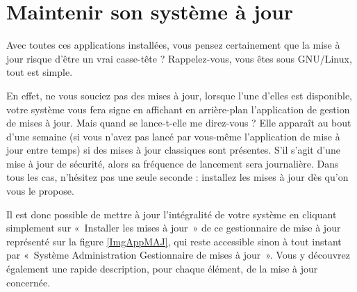 \section{Maintenir son système à jour}
Avec toutes ces applications installées, vous pensez certainement que la mise à jour risque d'être un vrai casse-tête ? Rappelez-vous, vous êtes sous GNU/Linux, tout est simple.\par
En effet, ne vous souciez pas des mises à jour, lorsque l'une d'elles est disponible, votre système vous fera signe en affichant en arrière-plan l'application de gestion de mises à jour. Mais quand se lance-t-elle me direz-vous ? Elle apparaît au bout d'une semaine (si vous n'avez pas lancé par vous-même l'application de mise à jour entre temps) si des mises à jour classiques sont présentes. S'il s'agit d'une mise à jour de sécurité, alors sa fréquence de lancement sera journalière. Dans tous les cas, n'hésitez pas une seule seconde : installez les mises à jour dès qu'on vous le propose.\par
Il est donc possible de mettre à jour l'intégralité de votre système en cliquant simplement sur «~Installer les mises à jour~» de ce gestionnaire de mise à jour représenté sur la figure \ref{ImgAppMAJ}, qui reste accessible sinon à tout instant par «~Système \FlecheDroite Administration \FlecheDroite Gestionnaire de mises à jour~». Vous y découvrez également une rapide description, pour chaque élément, de la mise à jour concernée.

